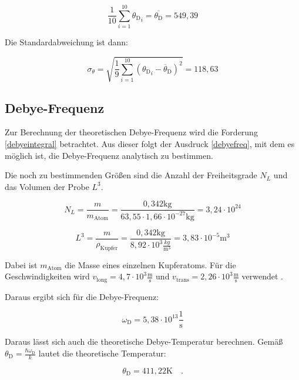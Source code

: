 \begin{equation}
\frac{1}{10}\sum\limits_{i=1}^{10}{\theta_{\text{D}}}_i=\overline{\theta_\text{D}}=549,39
\end{equation}

\noindent Die Standardabweichung ist dann:

\begin{equation}
\sigma_\theta=\sqrt{\frac{1}{9}\sum\limits_{i=1}^{10}({\theta_{\text{D}}}_i-\overline \theta_{\text{D}})^2}=118,63
\end{equation}

\subsection{Debye-Frequenz}
Zur Berechnung der theoretischen Debye-Frequenz wird die Forderung \eqref{debyeintegral} betrachtet. Aus dieser folgt der Ausdruck \eqref{debyefreq}, mit dem es möglich ist, die Debye-Frequenz analytisch zu bestimmen.

\noindent Die noch zu bestimmenden Größen sind die Anzahl der Freiheitsgrade \(N_L\) und das Volumen der Probe \(L^3\).

\begin{equation*}
N_L=\frac{m}{m_\text{Atom}}=\frac{0,342\text{kg}}{63,55\cdot 1,66\cdot10^{-27}\text{kg}}=3,24\cdot10^{24}
\end{equation*}

\begin{equation*}
L^3=\frac{m}{\rho_\text{Kupfer}}=\frac{0,342\text{kg}}{8,92\cdot10^3\frac{kg}{\text{m}^3}}=3,83\cdot10^{-5}\text{m}^3
\end{equation*}

\noindent Dabei ist \(m_\text{Atom}\) die Masse eines einzelnen Kupferatoms. Für die Geschwindigkeiten wird \(v_\text{long}=4,7\cdot10^3\frac{\text{m}}{\text{s}}\) und \(v_\text{trans}=2,26\cdot10^3\frac{\text{m}}{\text{s}}\) verwendet \cite{v47}.

\noindent Daraus ergibt sich für die Debye-Frequenz:

\begin{equation*}
\omega_\text{D}=5,38\cdot10^{13}\frac{1}{\text{s}}
\end{equation*}

\noindent Daraus lässt sich auch die theoretische Debye-Temperatur berechnen. Gemäß $\theta_\text{D}=\frac{\hbar\omega_\text{D}}{k}$ lautet die theoretische Temperatur:

\begin{equation*}
\theta_\text{D}=411,22\text{K}\quad.
\end{equation*}